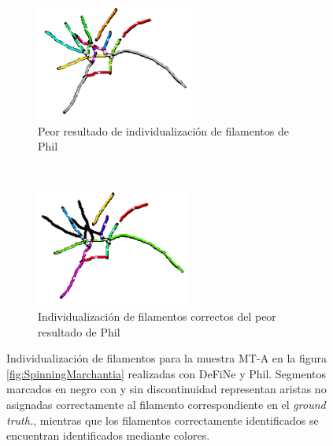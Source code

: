\begin{figure}[h!]
    \begin{subfigure}[t]{0.49\textwidth}
        \centering
        \includegraphics[height=1.5in]{resultImages/50-ROIs-Spinning-Marchantia-phil-s10-v05-antLabeled.png}
        \caption{Peor resultado de individualizaci\'on de filamentos de Phil}
        \label{SpinningMarchantiaResults-worstPhil}
    \end{subfigure}
    ~ 
    \begin{subfigure}[t]{0.49\textwidth}
        \centering
        \includegraphics[height=1.5in]{resultImages/50-ROIs-Spinning-Marchantia-phil-s10-v05-exactMatch-antLabeled.png}
        \caption{Individualizaci\'on de filamentos correctos del peor resultado de Phil}
        \label{fig:SpinningMarchantiaResults-worstPhilExact}
    \end{subfigure}
    
    \caption{Individualizaci\'on  de filamentos para la muestra MT-A en la figura \ref{fig:SpinningMarchantia} realizadas con DeFiNe y Phil. Segmentos marcados en negro con y sin discontinuidad representan aristas no asignadas correctamente al filamento correspondiente en el {\it ground truth.}, mientras que los filamentos correctamente identificados se encuentran identificados mediante colores.}
    \label{fig:SpinningMarchantiaResults}
\end{figure}

